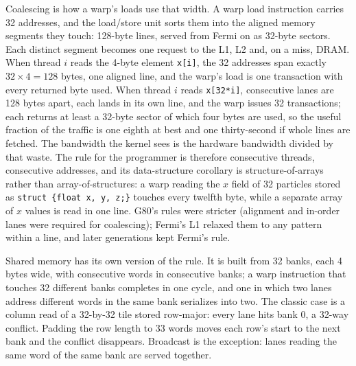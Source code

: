 \documentclass[11pt,letterpaper]{article}
\begin{document}
Coalescing is how a warp's loads use that width. A warp load instruction carries 32 addresses, and the load/store unit sorts them into the aligned memory segments they touch: 128-byte lines, served from Fermi on as 32-byte sectors. Each distinct segment becomes one request to the L1, L2 and, on a miss, DRAM. When thread $i$ reads the 4-byte element \texttt{x[i]}, the 32 addresses span exactly $32 \times 4 = 128$ bytes, one aligned line, and the warp's load is one transaction with every returned byte used. When thread $i$ reads \texttt{x[32*i]}, consecutive lanes are 128 bytes apart, each lands in its own line, and the warp issues 32 transactions; each returns at least a 32-byte sector of which four bytes are used, so the useful fraction of the traffic is one eighth at best and one thirty-second if whole lines are fetched. The bandwidth the kernel sees is the hardware bandwidth divided by that waste. The rule for the programmer is therefore consecutive threads, consecutive addresses, and its data-structure corollary is structure-of-arrays rather than array-of-structures: a warp reading the $x$ field of 32 particles stored as \texttt{struct \{float x, y, z;\}} touches every twelfth byte, while a separate array of $x$ values is read in one line. G80's rules were stricter (alignment and in-order lanes were required for coalescing); Fermi's L1 relaxed them to any pattern within a line, and later generations kept Fermi's rule.

Shared memory has its own version of the rule. It is built from 32 banks, each 4 bytes wide, with consecutive words in consecutive banks; a warp instruction that touches 32 different banks completes in one cycle, and one in which two lanes address different words in the same bank serializes into two. The classic case is a column read of a 32-by-32 tile stored row-major: every lane hits bank 0, a 32-way conflict. Padding the row length to 33 words moves each row's start to the next bank and the conflict disappears. Broadcast is the exception: lanes reading the same word of the same bank are served together.
\end{document}
